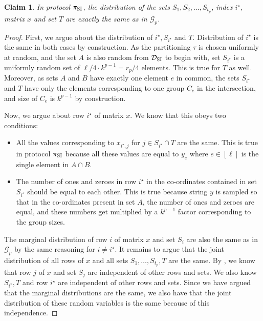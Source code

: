 \documentclass[11pt]{article}
\newtheorem{claim}[lemma]{Claim}
\theoremstyle{definition}
\newcommand{\cG}{\ensuremath{\mathcal{G}}}
\newcommand{\istar}{\ensuremath{i^{\star}}}
\newcommand{\prot}{\ensuremath{\pi}}
\newcommand{\cDSI}{\ensuremath{\mathcal{D}_{\textnormal{\textsc{SI}}}}}
\newcommand{\protsetint}{\ensuremath{\prot_{\textnormal{\textsc{SI}}}}}
\begin{document}
	
	\begin{claim}\label{clm:dist-set-int-same}
		In protocol $\protsetint$, the distribution of the sets $S_1, S_2, \ldots, S_{t_p}$, index $\istar$, matrix $x$ and set $T$ are exactly the same as in $\cG_p$. 
	\end{claim}
	\begin{proof}
		First, we argue about the distribution of $\istar,S_{\istar}$ and $T$. 
		Distribution of $\istar$ is the same in both cases by construction. 
		As the partitioning $\tau$ is chosen uniformly at random, and the set $A$ is also random from $\cDSI$ to begin with, set $S_{\istar}$ is a uniformly random set of $\ell/4 \cdot k^{p-1} = r_p/4$ elements. This is true for $T$ as well. Moreover, as sets $A$ and $B$ have exactly one element $e$ in common, the sets $S_{\istar}$ and $T$ have only the elements corresponding to one group $C_e$ in the intersection, and size of $C_e$ is $k^{p-1}$ by construction. 
		
		Now, we argue about row $\istar$ of matrix $x$. We know that this obeys two conditions:
		\begin{itemize}
			\item All the values corresponding to $x_{\istar, j}$ for $j \in S_{\istar} \cap T$ are the same. This is true in protocol $\protsetint$ because all these values are equal to $y_e$ where $e \in [\ell]$ is the single element in $A \cap B$. 
			
			\item The number of ones and zeroes in row $\istar$ in the co-ordinates contained in set $S_{\istar}$ should be equal to each other. This is true because string $y$ is sampled so that in the co-ordinates present in set $A$, the number of ones and zeroes are equal, and these numbers get multiplied by a $k^{p-1}$ factor corresponding to the group sizes. 
		\end{itemize}
		
		The marginal distribution of row $i$ of matrix $x$ and set $S_i$ are also the same as in $\cG_p$ by the same reasoning for $i \neq \istar$. 
		It remains to argue that the joint distribution of all rows of $x$ and all sets $S_1, \ldots, S_{t_p}, T$ are the same.  By , we know that row $j$ of $x$ and set $S_j$ are independent of other rows and sets. We also know $S_{\istar}, T$ and row $\istar$ are independent of other rows and sets. Since we have argued that the marginal distributions are the same, we also have that the joint distribution of these random variables is the same because of this independence. 
	\end{proof}
	
\end{document}
